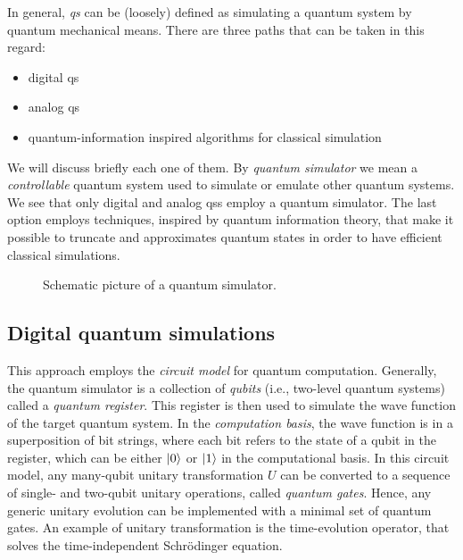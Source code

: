 In general, \emph{\acf{qs}} can be (loosely) defined as simulating a quantum system by quantum mechanical means.
There are three paths that can be taken in this regard:
\begin{itemize}
    \item digital \ac{qs}
    \item analog \ac{qs}
    \item quantum-information inspired algorithms for classical simulation
\end{itemize}
We will discuss briefly each one of them.
By \emph{quantum simulator} we mean a \emph{controllable} quantum system used to simulate or emulate other quantum systems.
We see that only digital and analog \ac{qs}s employ a quantum simulator.
The last option employs techniques, inspired by quantum information theory, that make it possible to truncate and approximates quantum states in order to have efficient classical simulations.



\begin{figure}[t]
    \centering
    
    \caption{Schematic picture of a quantum simulator.}
\end{figure}



\subsection{Digital quantum simulations}
\label{sub:digital_quantum_simulations}

This approach employs the \emph{circuit model} for quantum computation.
Generally, the quantum simulator is a collection of \emph{qubits} (i.e., two-level quantum systems) called a \emph{quantum register}.
This register is then used to simulate the wave function of the target quantum system.
In the \emph{computation basis}, the wave function is in a superposition of bit strings, where each bit refers to the state of a qubit in the register, which can be either $\ket{0}$ or $\ket{1}$ in the computational basis.
In this circuit model, any many-qubit unitary transformation $U$ can be converted to a sequence of single- and two-qubit unitary operations, called \emph{quantum gates}.
Hence, any generic unitary evolution can be implemented with a minimal set of quantum gates.
An example of unitary transformation is the time-evolution operator, that solves the time-independent Schrödinger equation.

